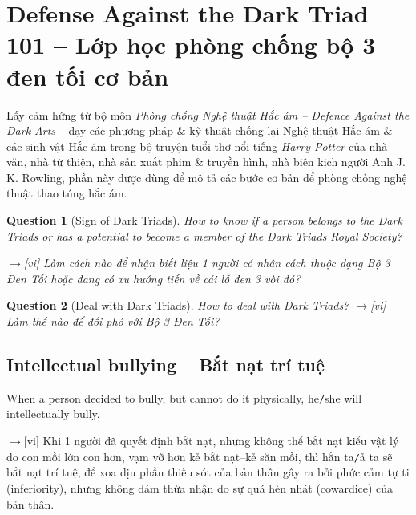 \documentclass[12pt,oneside]{book}
\newtheorem{question}{Question}
\begin{document}
\section{Defense Against the Dark Triad 101 -- Lớp học phòng chống bộ 3 đen tối cơ bản}
Lấy cảm hứng từ bộ môn {\it Phòng chống Nghệ thuật Hắc ám -- Defence Against the Dark Arts} -- dạy các phương pháp \& kỹ thuật chống lại Nghệ thuật Hắc ám \& các sinh vật Hắc ám trong bộ truyện tuổi thơ nổi tiếng {\it Harry Potter} của nhà văn, nhà từ thiện, nhà sản xuất phim \& truyền hình, nhà biên kịch người Anh {\sc J. K. Rowling}, phần này được dùng để mô tả các bước cơ bản để phòng chống nghệ thuật thao túng hắc ám.

\begin{question}[Sign of Dark Triads]
	How to know if a person belongs to the Dark Triads or has a potential to become a member of the Dark Triads Royal Society?
	
	{\sf[en]$\to$[vi]} Làm cách nào để nhận biết liệu 1 người có nhân cách thuộc dạng Bộ 3 Đen Tối hoặc đang có xu hướng tiến về cái lỗ đen 3 vòi đó?
\end{question}

\begin{question}[Deal with Dark Triads]
	How to deal with Dark Triads? {\sf[en]$\to$[vi]} Làm thế nào để đối phó với Bộ 3 Đen Tối?
\end{question}

\subsection{Intellectual bullying -- Bắt nạt trí tuệ}
When a person decided to bully, but cannot do it physically, he{\tt/}she will intellectually bully.

{\sf[en]$\to$[vi]} Khi 1 người đã quyết định bắt nạt, nhưng không thể bắt nạt kiểu vật lý do con mồi lớn con hơn, vạm vỡ hơn kẻ bắt nạt--kẻ săn mồi, thì hắn ta{\tt/}ả ta sẽ bắt nạt trí tuệ, để xoa dịu phần thiếu sót của bản thân gây ra bởi phức cảm tự ti (inferiority), nhưng không dám thừa nhận do sự quá hèn nhát (cowardice) của bản thân.
\end{document}
